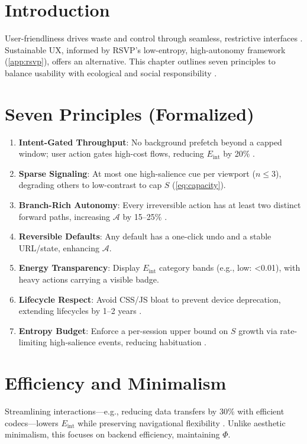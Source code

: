\documentclass[openany]{book}
\newcommand{\PhiS}{\Phi} %
\newcommand{\Sent}{S} %
\newcommand{\Eint}{E_{\mathrm{int}}} %
\newcommand{\Auton}{\mathcal{A}} %
\newcommand{\kWh}{\mathrm{kWh}}
\begin{document}
\section{Introduction}
\label{sec:principles-intro}
User-friendliness drives waste and control through seamless, restrictive interfaces \citep{doctorow2022}. Sustainable UX, informed by RSVP’s low-entropy, high-autonomy framework (\cref{app:rsvp}), offers an alternative. This chapter outlines seven principles to balance usability with ecological and social responsibility \citep{designlab2024}.

\section{Seven Principles (Formalized)}
\label{sec:seven}
\begin{enumerate}[label=\textbf{P\arabic*}.]
  \item \textbf{Intent-Gated Throughput}: No background prefetch beyond a capped window; user action gates high-cost flows, reducing $\Eint$ by 20\% \citep{extentia2024}.
  \item \textbf{Sparse Signaling}: At most one high-salience cue per viewport ($n \leq 3$), degrading others to low-contrast to cap $\Sent$ (\cref{eq:capacity}).
  \item \textbf{Branch-Rich Autonomy}: Every irreversible action has at least two distinct forward paths, increasing $\Auton$ by 15–25\% \citep{doctorow2022}.
  \item \textbf{Reversible Defaults}: Any default has a one-click undo and a stable URL/state, enhancing $\Auton$.
  \item \textbf{Energy Transparency}: Display $\Eint$ category bands (e.g., low: \SI{<0.01}{\kWh}), with heavy actions carrying a visible badge.
  \item \textbf{Lifecycle Respect}: Avoid CSS/JS bloat to prevent device deprecation, extending lifecycles by 1–2 years \citep{designlab2024}.
  \item \textbf{Entropy Budget}: Enforce a per-session upper bound on $\Sent$ growth via rate-limiting high-salience events, reducing habituation \citep{colak2024}.
\end{enumerate}

\section{Efficiency and Minimalism}
\label{sec:principles-efficiency}
Streamlining interactions—e.g., reducing data transfers by 30\% with efficient codecs—lowers $\Eint$ while preserving navigational flexibility \citep{extentia2024}. Unlike aesthetic minimalism, this focuses on backend efficiency, maintaining $\PhiS$.
\end{document}
